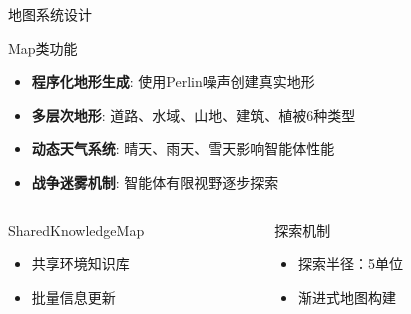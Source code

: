 \documentclass[
10pt,
aspectratio=169,
]{beamer}
\begin{document}
\begin{frame}{地图系统设计}
    \begin{block}{Map类功能}
        \begin{itemize}
            \item \textbf{程序化地形生成}: 使用Perlin噪声创建真实地形
            \item \textbf{多层次地形}: 道路、水域、山地、建筑、植被6种类型
            \item \textbf{动态天气系统}: 晴天、雨天、雪天影响智能体性能
            \item \textbf{战争迷雾机制}: 智能体有限视野逐步探索
        \end{itemize}
    \end{block}
    
    \begin{columns}
        \begin{column}{0.5\textwidth}
            \begin{exampleblock}{SharedKnowledgeMap}
                \begin{itemize}
                    \item 共享环境知识库
                    \item 批量信息更新
                \end{itemize}
            \end{exampleblock}
        \end{column}
        \begin{column}{0.5\textwidth}
            \begin{alertblock}{探索机制}
                \begin{itemize}
                    \item 探索半径：5单位
                    \item 渐进式地图构建
                \end{itemize}
            \end{alertblock}
        \end{column}
    \end{columns}
\end{frame}
\end{document}
